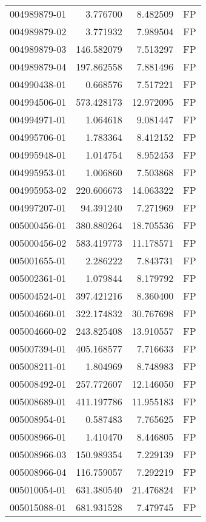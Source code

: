 \begin{tabular}{lrrl}
004989879-01 &    3.776700 &     8.482509 &   FP \\
004989879-02 &    3.771932 &     7.989504 &   FP \\
004989879-03 &  146.582079 &     7.513297 &   FP \\
004989879-04 &  197.862558 &     7.881496 &   FP \\
004990438-01 &    0.668576 &     7.517221 &   FP \\
004994506-01 &  573.428173 &    12.972095 &   FP \\
004994971-01 &    1.064618 &     9.081447 &   FP \\
004995706-01 &    1.783364 &     8.412152 &   FP \\
004995948-01 &    1.014754 &     8.952453 &   FP \\
004995953-01 &    1.006860 &     7.503868 &   FP \\
004995953-02 &  220.606673 &    14.063322 &   FP \\
004997207-01 &   94.391240 &     7.271969 &   FP \\
005000456-01 &  380.880264 &    18.705536 &   FP \\
005000456-02 &  583.419773 &    11.178571 &   FP \\
005001655-01 &    2.286222 &     7.843731 &   FP \\
005002361-01 &    1.079844 &     8.179792 &   FP \\
005004524-01 &  397.421216 &     8.360400 &   FP \\
005004660-01 &  322.174832 &    30.767698 &   FP \\
005004660-02 &  243.825408 &    13.910557 &   FP \\
005007394-01 &  405.168577 &     7.716633 &   FP \\
005008211-01 &    1.804969 &     8.748983 &   FP \\
005008492-01 &  257.772607 &    12.146050 &   FP \\
005008689-01 &  411.197786 &    11.955183 &   FP \\
005008954-01 &    0.587483 &     7.765625 &   FP \\
005008966-01 &    1.410470 &     8.446805 &   FP \\
005008966-03 &  150.989354 &     7.229139 &   FP \\
005008966-04 &  116.759057 &     7.292219 &   FP \\
005010054-01 &  631.380540 &    21.476824 &   FP \\
005015088-01 &  681.931528 &     7.479745 &   FP \\

\end{tabular}

